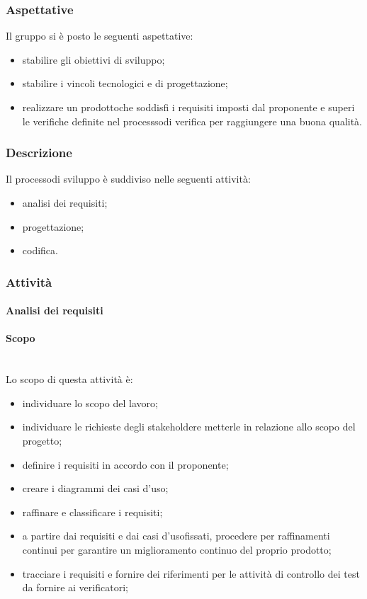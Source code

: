 		\subsubsection{Aspettative}
		Il gruppo si è posto le seguenti aspettative:
		\begin{itemize}
			\item stabilire gli obiettivi di sviluppo;
			\item stabilire i vincoli tecnologici e di progettazione\glo;
			\item realizzare un prodotto\glosp che soddisfi i requisiti imposti dal proponente e superi le verifiche definite nel processso\glosp di verifica per raggiungere una buona qualità.
		\end{itemize}
		\subsubsection{Descrizione}
		Il processo\glosp di sviluppo è suddiviso nelle seguenti attività:
		\begin{itemize}
			\item analisi dei requisiti;
			\item progettazione\glo;
			\item codifica.
		\end{itemize}
		\subsubsection{Attività}
		\paragraph{Analisi dei requisiti}
		\paragraph*{Scopo}\mbox{}\\ [1mm] 
		Lo scopo di questa attività è:
		\begin{itemize}
			\item individuare lo scopo del lavoro;
			\item individuare le richieste degli stakeholder\glosp e metterle in relazione allo scopo del progetto\glo;
			\item definire i requisiti in accordo con il proponente;
			\item creare i diagrammi dei casi d'uso\glo;
			\item raffinare e classificare i requisiti;
			\item a partire dai requisiti e dai casi d'uso\glosp fissati, procedere per raffinamenti continui per garantire un miglioramento continuo del proprio prodotto\glo;
			\item tracciare i requisiti e fornire dei riferimenti per le attività di controllo dei test da fornire ai verificatori;
		\end{itemize}
